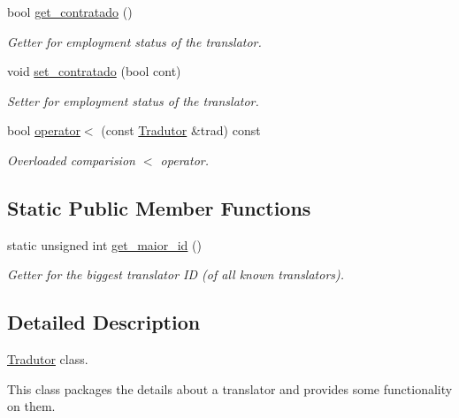 \begin{DoxyCompactItemize}
bool \hyperlink{class_tradutor_abfd51adb78973d8bbc3bbd35eb5d5b94}{get\-\_\-contratado} ()
\begin{DoxyCompactList}\small\item\em Getter for employment status of the translator. \end{DoxyCompactList}\item 
void \hyperlink{class_tradutor_a00b1ffa1dc1a0eb9fabf6e240a61b94b}{set\-\_\-contratado} (bool cont)
\begin{DoxyCompactList}\small\item\em Setter for employment status of the translator. \end{DoxyCompactList}\item 
bool \hyperlink{class_tradutor_a33f43a54dbef52d8a25796c5ecd6c00a}{operator$<$} (const \hyperlink{class_tradutor}{Tradutor} \&trad) const 
\begin{DoxyCompactList}\small\item\em Overloaded comparision $<$ operator. \end{DoxyCompactList}\end{DoxyCompactItemize}
\subsection*{Static Public Member Functions}
\begin{DoxyCompactItemize}
\item 
static unsigned int \hyperlink{class_tradutor_af2caad7e33c443f238851c5bb2d63930}{get\-\_\-maior\-\_\-id} ()
\begin{DoxyCompactList}\small\item\em Getter for the biggest translator I\-D (of all known translators). \end{DoxyCompactList}\end{DoxyCompactItemize}


\subsection{Detailed Description}
\hyperlink{class_tradutor}{Tradutor} class. 

This class packages the details about a translator and provides some functionality on them. 


